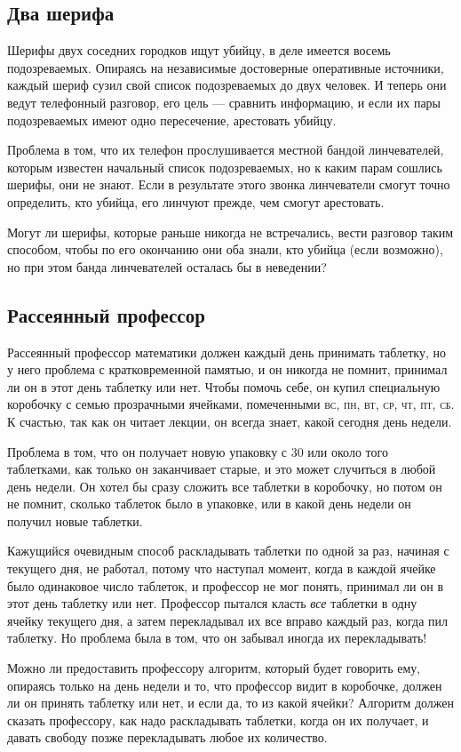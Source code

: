\subsection*{Два шерифа}%

Шерифы двух соседних городков ищут убийцу, в деле имеется восемь подозреваемых.
Опираясь на независимые достоверные оперативные источники, каждый шериф сузил свой список подозреваемых до двух человек.
И теперь они ведут телефонный разговор, его цель --- сравнить информацию, и если их пары подозреваемых имеют одно пересечение, арестовать убийцу.

Проблема в том, что их телефон прослушивается местной бандой линчевателей, которым известен начальный список подозреваемых, но к каким парам сошлись шерифы, они не знают.
Если в результате этого звонка линчеватели смогут точно определить, кто убийца, его линчуют прежде, чем смогут арестовать.

Могут ли шерифы, которые раньше никогда не встречались, вести разговор таким способом, чтобы по его окончанию они оба знали, кто убийца (если возможно), но при этом банда линчевателей осталась бы в неведении?

\subsection*{Рассеянный профессор}%

Рассеянный профессор математики должен каждый день принимать таблетку, но у него проблема с кратковременной памятью, и он никогда не помнит, принимал ли он в этот день таблетку или нет.
Чтобы помочь себе, он купил специальную коробочку с семью прозрачными ячейками, помеченными \textsc{вс}, \textsc{пн}, \textsc{вт}, \textsc{ср}, \textsc{чт}, \textsc{пт}, \textsc{сб}.
К счастью, так как он читает лекции, он всегда знает, какой сегодня день недели.

Проблема в том, что он получает новую упаковку с 30 или около того таблетками, как только он заканчивает старые, и это может случиться в любой день недели.
Он хотел бы сразу сложить все таблетки в коробочку, но потом он не помнит, сколько таблеток было в упаковке, или в какой день недели он получил новые таблетки.

Кажущийся очевидным способ раскладывать таблетки по одной за раз, начиная с текущего дня, не работал, потому что наступал момент, когда в каждой ячейке было одинаковое число таблеток, и профессор не мог понять, принимал ли он в этот день таблетку или нет.
Профессор пытался класть \emph{все} таблетки в одну ячейку текущего дня, а затем перекладывал их все вправо каждый раз, когда пил таблетку.
Но проблема была в том, что он забывал иногда их перекладывать!

Можно ли предоставить профессору алгоритм, который будет говорить ему, опираясь только на день недели и то, что профессор видит в коробочке, должен ли он принять таблетку или нет, и если да, то из какой ячейки? Алгоритм должен сказать профессору, как надо раскладывать таблетки, когда он их получает, и давать свободу позже перекладывать любое их количество.
